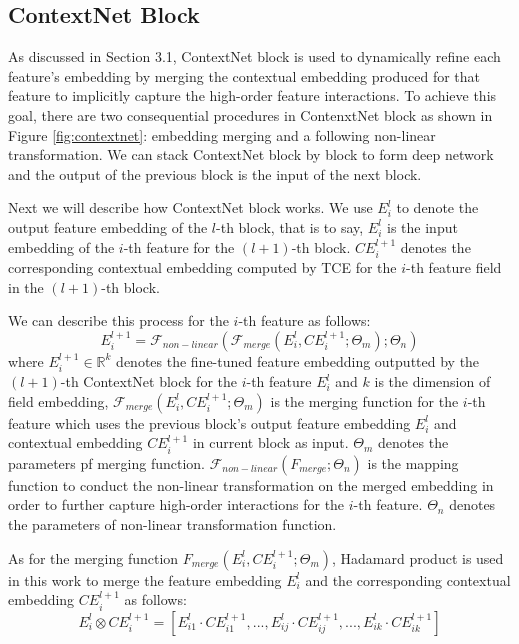 \documentclass[sigconf]{acmart}
\begin{document}
\subsection{ContextNet Block}
As discussed in Section 3.1,  ContextNet block is used to dynamically refine each feature's embedding by merging the contextual embedding produced for that feature to implicitly capture the high-order feature interactions. To achieve this goal, there are two consequential procedures in  ContenxtNet block as shown in Figure \ref{fig:contextnet}: embedding merging and a following non-linear transformation. We can stack ContextNet block by block to form deep network and the output of the previous block is the input of the next block.


Next we will describe how ContextNet block works. We use  $E_i^l$ to denote the output feature embedding of the $l$-th block, that is to say, $E_i^l$ is the input embedding of the $i$-th feature for the $(l+1)$-th block. $CE_i^{l+1}$ denotes the corresponding contextual embedding computed by TCE for the $i$-th feature field in the $(l+1)$-th block.


We can describe this process for the $i$-th feature as follows:
\begin{equation}
  E_{i}^{l+1} = \mathcal{F}_{non-linear}(\mathcal{F}_{merge}(E_{i}^{l}, CE_{i}^{l+1}; \Theta_m); \Theta_n)
\end{equation}
where $E_i^{l+1} \in \mathbb{R}^k$ denotes the fine-tuned feature embedding outputted by the $(l+1)$-th ContextNet block for the $i$-th feature $E^l_i$ and $k$ is the dimension of field embedding, $\mathcal{F}_{merge}(E_{i}^{l}, CE_{i}^{l+1}; \Theta_m)$ is the merging function for the $i$-th feature which uses the previous block's output feature embedding $E_i^{l}$ and contextual embedding $CE_i^{l+1}$ in current block as input. $\Theta_m$ denotes the parameters pf merging function. $\mathcal{F}_{non-linear}(F_{merge}; \Theta_n)$ is the mapping function to conduct the non-linear transformation on the merged embedding in order to further capture high-order interactions for the $i$-th feature. $\Theta_n$ denotes the parameters of non-linear transformation function.


As for the merging function $F_{merge}(E_i^l, CE^{l+1}_i; \Theta_m)$, Hadamard product is used  in this work to merge the feature embedding $E_i^l$ and the corresponding contextual embedding $CE_i^{l+1}$ as follows:
\begin{equation}
  E_i^{l} \otimes CE_{i}^{l+1} = \left[E_{i1}^l\cdot CE_{i1}^{l+1}, ..., E_{ij}^l\cdot CE_{ij}^{l+1}, ..., E_{ik}^l\cdot CE_{ik}^{l+1}\right]
\end{equation}
\end{document}
